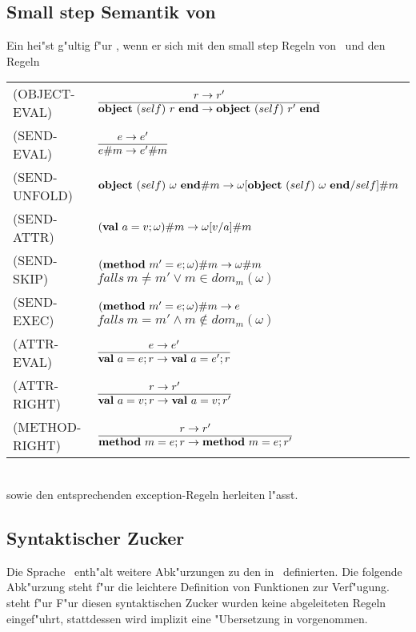 \subsection{Small step Semantik von \LTWOO}

Ein  hei"st g"ultig f"ur \LTWOO, wenn er sich mit den small step Regeln von \LTWO\ und den Regeln\\[5mm]
  \begin{tabular}{ll}
    \mbox{(OBJECT-EVAL)}    & $\regel{r \to r'}
                                     {\object{self}{r} \to \object{self}{r'}}$ \\[5mm]
    \mbox{(SEND-EVAL)}      & $\regel{e \to e'}
                                     {\send{e}{m} \to \send{e'}{m}}$ \\[5mm]
    \mbox{(SEND-UNFOLD)}    & $\textbf{object}\ (self)\ \omega\ \textbf{end} \# m \to 
                               \omega [\textbf{object}\ (self)\ \omega\ \textbf{end}/self] \# m$ \\[3mm]
    \mbox{(SEND-ATTR)}      & $(\textbf{val}\ a=v;\omega) \# m \to \omega [v/a] \# m$ \\[3mm]
    \mbox{(SEND-SKIP)}      & $(\textbf{method}\ m'=e;\omega) \# m \to \omega \# m$ \ 
                              $falls\ m \neq m' \vee m \in dom_m(\omega)$ \\[3mm]
    \mbox{(SEND-EXEC)}      & $(\textbf{method}\ m'=e;\omega) \# m \to e$ \ 
                              $falls\ m = m' \wedge m \notin dom_m(\omega)$ \\[3mm]
    \mbox{(ATTR-EVAL)}      & $\regel{e \to e'}
                                     {\val{a}{e}r \to \val{a}{e'}r}$ \\[5mm]
    \mbox{(ATTR-RIGHT)}     & $\regel{r \to r'}
                                     {\val{a}{v}r \to \val{a}{v}r'}$ \\[5mm]
    \mbox{(METHOD-RIGHT)}   & $\regel{r \to r'}
                                     {\method{m}{e}r \to \method{m}{e}r'}$
  \end{tabular}\\[7mm]
sowie den entsprechenden exception-Regeln herleiten l"asst.


\subsection{Syntaktischer Zucker}

Die Sprache \LTWOO\ enth"alt weitere Abk"urzungen zu den in \LTWO\ definierten. Die folgende Abk"urzung steht f"ur die leichtere Definition von Funktionen zur Verf"ugung.
\beqns
  \method{m (\id_1: \tau_1)\ldots(\id_n: \tau_n):\tau}{e}
\eeqns
steht f"ur
\beqns
\eeqns
F"ur diesen syntaktischen Zucker wurden keine abgeleiteten Regeln eingef"uhrt, stattdessen wird implizit
eine "Ubersetzung in  vorgenommen.


